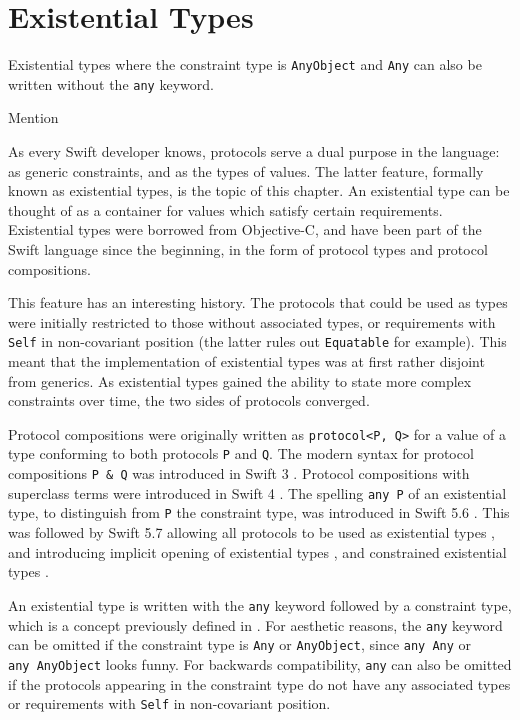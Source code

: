 \documentclass[../generics]{subfiles}
\begin{document}
\chapter[]{Existential Types}\label{existentialtypes}

\ifWIP

Existential types where the constraint type is \texttt{AnyObject} and \texttt{Any} can also be written without the \texttt{any} keyword.
 
Mention \cite{rajexistential}

As every Swift developer knows, protocols serve a dual purpose in the language: as generic constraints, and as the types of values. The latter feature, formally known as existential types, is the topic of this chapter. An existential type can be thought of as a container for values which satisfy certain requirements. Existential types were borrowed from Objective-C, and have been part of the Swift language since the beginning, in the form of protocol types and protocol compositions. 

This feature has an interesting history. The protocols that could be used as types were initially restricted to those without associated types, or requirements with \texttt{Self} in non-covariant position (the latter rules out \texttt{Equatable} for example). This meant that the implementation of existential types was at first rather disjoint from generics. As existential types gained the ability to state more complex constraints over time, the two sides of protocols converged.

Protocol compositions were originally written as \texttt{protocol<P,~Q>} for a value of a type conforming to both protocols \texttt{P} and \texttt{Q}. The modern syntax for protocol compositions \texttt{P~\&~Q} was introduced in Swift 3 \cite{se0095}. Protocol compositions with superclass terms were introduced in Swift 4 \cite{se0156}. The spelling \texttt{any P} of an existential type, to distinguish from \texttt{P} the constraint type, was introduced in Swift 5.6 \cite{se0355}. This was followed by Swift 5.7 allowing all protocols to be used as existential types \cite{se0309}, and introducing implicit opening of existential types \cite{se0352}, and constrained existential types \cite{se0353}.

An existential type is written with the \texttt{any} keyword followed by a constraint type, which is a concept previously defined in . For aesthetic reasons, the \texttt{any} keyword can be omitted if the constraint type is \texttt{Any} or \texttt{AnyObject}, since \texttt{any~Any} or \texttt{any~AnyObject} looks funny. For backwards compatibility, \texttt{any} can also be omitted if the protocols appearing in the constraint type do not have any associated types or requirements with \texttt{Self} in non-covariant position.
\end{document}
